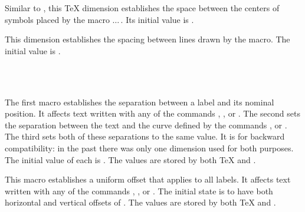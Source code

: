 \documentclass[letterpaper]{article}
\begin{document}
\begin{cd}
%
\end{cd}

Similar to , this \TeX{} dimension establishes the space
between the centers of symbols placed by the macro
$\ldots\,$. Its initial value is \dim{5pt}.

\begin{cd}
%
\end{cd}

This dimension establishes the spacing between lines drawn by the
 macro. The initial value is \dim{3pt}.

\begin{cd}
\\
\\
%
%
%
\end{cd}

The first macro establishes the separation between a label and its
nominal position. It affects text written with any of the commands
, ,  or . The second
sets the separation between the text and the curve defined by the
commands ,  or . The
third sets both of these separations to the same value. It is for
backward compatibility: in the past there was only one dimension used
for both purposes. The initial value of each is \dim{0pt}. The values
are stored by both \TeX{} and \MF{}.

\begin{cd}
%
\end{cd}

This macro establishes a uniform offset that applies to all labels. It
affects text written with any of the commands , ,
 or . The initial state is to have both
horizontal and vertical offsets of \dim{0pt}. The values are stored by
both \TeX{} and \MF{}.

\begin{cd}
%
\end{cd}
\end{document}
